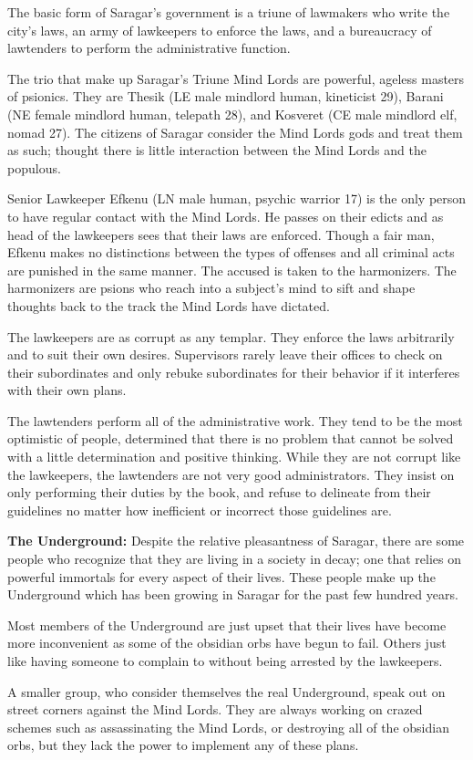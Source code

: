 {
	The basic form of Saragar's government is a triune of 	lawmakers who write the city's laws, an army of lawkeepers to enforce the laws, and a bureaucracy of lawtenders to perform the administrative function.

	The trio that make up Saragar's Triune Mind Lords are powerful, ageless masters of psionics. They are Thesik (LE male mindlord human, kineticist 29), Barani (NE female mindlord human, telepath 28), and Kosveret (CE male mindlord elf, nomad 27). The citizens of Saragar consider the Mind Lords gods and treat them as such; thought there is little interaction between the Mind Lords and the populous.

	Senior Lawkeeper Efkenu (LN male human, psychic warrior 17) is the only person to have regular contact with the Mind Lords. He passes on their edicts and as head of the lawkeepers sees that their laws are enforced. Though a fair man, Efkenu makes no distinctions between the types of offenses and all criminal acts are punished in the same manner. The accused is taken to the harmonizers. The harmonizers are psions who reach into a subject's mind to sift and shape thoughts back to the track the Mind Lords have dictated.

	The lawkeepers are as corrupt as any templar. They enforce the laws arbitrarily and to suit their own desires. Supervisors rarely leave their offices to check on their subordinates and only rebuke subordinates for their behavior if it interferes with their own plans.

	The lawtenders perform all of the administrative work. They tend to be the most optimistic of people, determined that there is no problem that cannot be solved with a little determination and positive thinking. While they are not corrupt like the lawkeepers, the lawtenders are not very good administrators. They insist on only performing their duties by the book, and refuse to delineate from their guidelines no matter how inefficient or incorrect those guidelines are.
}
{
	\textbf{The Underground:} Despite the relative pleasantness of Saragar, there are some people who recognize that they are living in a society in decay; one that relies on powerful immortals for every aspect of their lives. These people make up the Underground which has been growing in Saragar for the past few hundred years.

	Most members of the Underground are just upset that their lives have become more inconvenient as some of the obsidian orbs have begun to fail. Others just like having someone to complain to without being arrested by the lawkeepers.

	A smaller group, who consider themselves the real Underground, speak out on street corners against the Mind Lords. They are always working on crazed schemes such as assassinating the Mind Lords, or destroying all of the obsidian orbs, but they lack the power to implement any of these plans.
}
